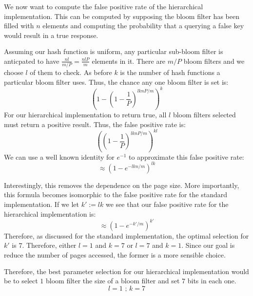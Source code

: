 We now want to compute the false positive rate of the hierarchical implementation.
This can be computed by supposing the bloom filter has been filled with $n$ elements and computing the probability that a querying a false key would result in a true response.

Assuming our hash function is uniform, any particular sub-bloom filter is anticpated to have $\frac{nl}{m/P} = \frac{nlP}{m} $ elements in it.
There are $m/P$ bloom filters and we choose $l$ of them to check. As before $k$ is the number of hash functions a particular bloom filter uses.
Thus, the chance any one bloom filter is set is:
$$(1-(1 - \frac{1}{P})^{lknP/m})^k$$
For our hierarchical implementation to return true, all $l$ bloom filters selected must return a positive result.
Thus, the false positive rate is:
$$((1 - \frac{1}{P})^{lknP/m})^{kl}$$
We can use a well known identity for $e^{-1}$ to approximate this false positive rate:
$$\approx (1 - e^{-lkn/m})^{lk}$$

Interestingly, this removes the dependence on the page size.
More importantly, this formula becomes isomorphic to the false positive rate for the standard implementation.
If we let $k' := lk$ we see that our false positive rate for the hierarchical implementation is:
$$\approx (1 - e^{-k'/m})^{k'}$$
Therefore, as discussed for the standard implementation, the optimal selection for $k'$ is $7$.
Therefore, either $l=1$ and $k=7$ or $l=7$ and $k=1$.
Since our goal is reduce the number of pages accessed, the former is a more sensible choice.

Therefore, the best parameter selection for our hierarchical implementation would be to select $1$ bloom filter the size of a bloom filter and set $7$ bits in each one.
$$l = 1\text{ ; } k = 7$$
